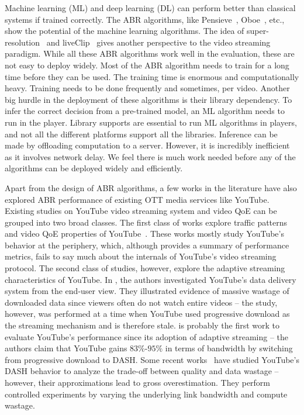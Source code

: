 Machine learning (ML) and deep learning (DL) can perform better than classical systems if trained correctly. The ABR algorithms, like Pensieve~\cite{Mao2017}, Oboe~\cite{Akhtar2018}, etc., show the potential of the machine learning algorithms. The idea of super-resolution~\cite{9155384} and liveClip~\cite{10.1145/3386290.3396937} gives another perspective to the video streaming paradigm. While all these ABR algorithms work well in the evaluation, these are not easy to deploy widely. Most of the ABR algorithm needs to train for a long time before they can be used. The training time is enormous and computationally heavy. Training needs to be done frequently and sometimes, per video. Another big hurdle in the deployment of these algorithms is their library dependency. To infer the correct decision from a pre-trained model, an ML algorithm needs to run in the player. Library supports are essential to run ML algorithms in players, and not all the different platforms support all the libraries. Inference can be made by offloading computation to a server. However, it is incredibly inefficient as it involves network delay. We feel there is much work needed before any of the algorithms can be deployed widely and efficiently.

Apart from the design of ABR algorithms, a few works in the literature have also explored ABR performance of existing OTT media services like YouTube. Existing studies on YouTube video streaming system and video QoE can be grouped into two broad classes. The first class of works explore traffic patterns and video QoE properties of YouTube~\cite{gill2007youtube,krishnappa2013dashing,wamser2016modeling,wamser2015poster,6757893ieeeexp,7129790ieeeexp}. These works mostly study YouTube's behavior at the periphery, which, although provides a summary of performance metrics, fails to say much about the internals of YouTube's video streaming protocol. The second class of studies, however, explore the adaptive streaming characteristics of YouTube. In \cite{finamore2011youtube}, the authors investigated YouTube's data delivery system from the end-user view. They illustrated evidence of massive wastage of downloaded data since viewers often do not watch entire videos -- the study, however, was performed at a time when YouTube used progressive download as the streaming mechanism and is therefore stale. \cite{krishnappa2013dashing} is probably the first work to evaluate YouTube's performance since its adoption of adaptive streaming -- the authors claim that YouTube gains $83\%$-$95\%$ in terms of bandwidth by switching from progressive download to DASH. Some recent works~\cite{sieber2015cost,seufert2015youtube,sieber2016sacrificing} have studied YouTube's DASH behavior to analyze the trade-off between quality and data wastage -- however, their approximations lead to gross overestimation. They perform controlled experiments by varying the underlying link bandwidth and compute wastage.

